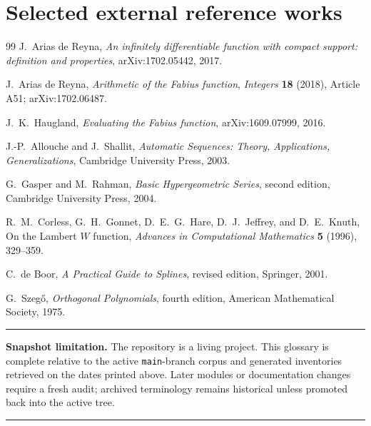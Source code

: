 \documentclass[11pt,oneside]{article}
\newenvironment{scopebox}{%
  \par\smallskip\noindent\begin{center}\begin{minipage}{0.94\textwidth}%
  \color{black}\hrule\vspace{0.6em}\small
}{%
  \vspace{0.6em}\hrule\end{minipage}\end{center}\smallskip
}
\begin{document}
\section{Selected external reference works}
\begin{thebibliography}{99}
J.~Arias de Reyna,
\emph{An infinitely differentiable function with compact support: definition and properties},
arXiv:1702.05442, 2017.

J.~Arias de Reyna,
\emph{Arithmetic of the Fabius function},
\emph{Integers} \textbf{18} (2018), Article A51; arXiv:1702.06487.

J.~K.~Haugland,
\emph{Evaluating the Fabius function},
arXiv:1609.07999, 2016.

J.-P.~Allouche and J.~Shallit,
\emph{Automatic Sequences: Theory, Applications, Generalizations},
Cambridge University Press, 2003.

G.~Gasper and M.~Rahman,
\emph{Basic Hypergeometric Series}, second edition,
Cambridge University Press, 2004.

R.~M.~Corless, G.~H.~Gonnet, D.~E.~G.~Hare, D.~J.~Jeffrey, and D.~E.~Knuth,
On the Lambert \(W\) function,
\emph{Advances in Computational Mathematics} \textbf{5} (1996), 329--359.

C.~de Boor,
\emph{A Practical Guide to Splines}, revised edition,
Springer, 2001.

G.~Szegő,
\emph{Orthogonal Polynomials}, fourth edition,
American Mathematical Society, 1975.
\end{thebibliography}

\begin{scopebox}
\textbf{Snapshot limitation.}
The repository is a living project.  This glossary is complete relative to the
active \texttt{main}-branch corpus and generated inventories retrieved on the
dates printed above.  Later modules or documentation changes require a fresh
audit; archived terminology remains historical unless promoted back into the
active tree.
\end{scopebox}
\end{document}
